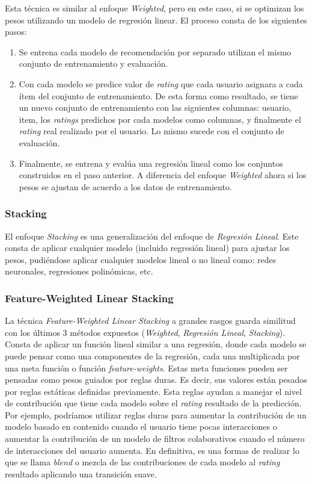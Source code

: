 \documentclass[11pt,a4paper,twoside]{thesis}
\begin{document}
Esta técnica es similar al enfoque \textit{Weighted}, pero en este caso, si se
optimizan los pesos utilizando un modelo de regresión linear. El proceso consta
de los siguientes pasos:

\begin{enumerate}
	\item Se entrena cada modelo de recomendación por separado utilizan el mismo conjunto
	      de entrenamiento y evaluación.
	\item Con cada modelo se predice valor de \textit{rating} que cada usuario asignara a
	      cada ítem del conjunto de entrenamiento. De esta forma como resultado, se tiene
	      un nuevo conjunto de entrenamiento con las siguientes columnas: usuario, item,
	      los \textit{ratings} predichos por cada modelos como columnas, y finalmente el
	      \textit{rating} real realizado por el usuario. Lo mismo sucede con el conjunto
	      de evaluación.
	\item Finalmente, se entrena y evalúa una regresión lineal como los conjuntos
	      construidos en el paso anterior. A diferencia del enfoque \textit{Weighted}
	      ahora si los pesos se ajustan de acuerdo a los datos de entrenamiento.
\end{enumerate}

\subsubsection{Stacking}

El enfoque \textit{Stacking} es una generalización del enfoque de
\textit{Regresión Lineal}. Este consta de aplicar cualquier modelo (incluido
regresión lineal) para ajustar los pesos, pudiéndose aplicar cualquier modelos
lineal o no lineal como: redes neuronales, regresiones polinómicas, etc.

\subsubsection{Feature-Weighted Linear Stacking}

La técnica \textit{Feature-Weighted Linear Stacking} \cite{sill2009feature,
	falk2019practical} a grandes rasgos guarda similitud con los últimos 3 métodos
expuestos (\textit{Weighted}, \textit{Regresión Lineal}, \textit{Stacking}).
Consta de aplicar un función lineal similar a una regresión, donde cada modelo
se puede pensar como una componentes de la regresión, cada una multiplicada por
una meta función o función \textit{feature-weights}. Estas meta funciones
pueden ser pensadas como pesos guiados por reglas duras. Es decir, sus valores
están pesados por reglas estáticas definidas previamente. Esta reglas ayudan a
manejar el nivel de contribución que tiene cada modelo sobre el \textit{rating}
resultado de la predicción. Por ejemplo, podríamos utilizar reglas duras para
aumentar la contribución de un modelo basado en contenido cuando el usuario
tiene pocas interacciones o aumentar la contribución de un modelo de filtros
colaborativos cuando el número de interacciones del usuario aumenta. En
definitiva, es una formas de realizar lo que se llama \textit{blend} o mezcla
de las contribuciones de cada modelo al \textit{rating} resultado aplicando una
transición suave.
\end{document}

